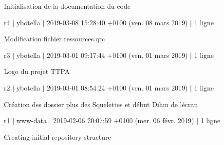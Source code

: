 Initialisation de la documentation du code

r4 $\vert$ ybotella $\vert$ 2019-\/03-\/08 15\+:28\+:40 +0100 (ven. 08 mars 2019) $\vert$ 1 ligne

Modification fichier ressources.\+qrc

r3 $\vert$ ybotella $\vert$ 2019-\/03-\/01 09\+:17\+:44 +0100 (ven. 01 mars 2019) $\vert$ 1 ligne

Logo du projet T\+T\+PA

r2 $\vert$ ybotella $\vert$ 2019-\/03-\/01 08\+:54\+:24 +0100 (ven. 01 mars 2019) $\vert$ 1 ligne

Création des dossier plus des Squelettes et début D\textquotesingle{}ihm de l\textquotesingle{}écran

r1 $\vert$ www-\/data $\vert$ 2019-\/02-\/06 20\+:07\+:59 +0100 (mer. 06 févr. 2019) $\vert$ 1 ligne

Creating initial repository structure 